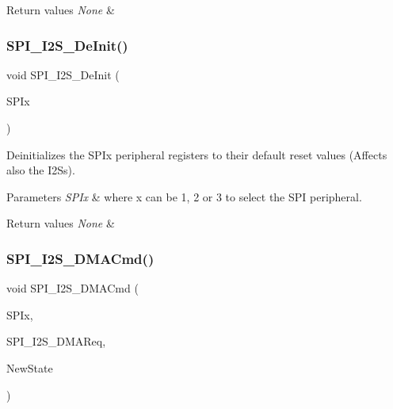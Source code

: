 \begin{DoxyRetVals}{Return values}
{\em None} & \\
\hline
\end{DoxyRetVals}
\mbox{\label{group___s_p_i___exported___functions_gabe36880945fa56785283a9c0092124cc}} 
\subsubsection{\texorpdfstring{SPI\_I2S\_DeInit()}{SPI\_I2S\_DeInit()}}
{\footnotesize\ttfamily void S\+P\+I\+\_\+\+I2\+S\+\_\+\+De\+Init (\begin{DoxyParamCaption}\item[{\mbox{\hyperlink{struct_s_p_i___type_def}{S\+P\+I\+\_\+\+Type\+Def}} $\ast$}]{S\+P\+Ix }\end{DoxyParamCaption})}



Deinitializes the S\+P\+Ix peripheral registers to their default reset values (Affects also the I2\+Ss). 


\begin{DoxyParams}{Parameters}
{\em S\+P\+Ix} & where x can be 1, 2 or 3 to select the S\+PI peripheral. \\
\hline
\end{DoxyParams}

\begin{DoxyRetVals}{Return values}
{\em None} & \\
\hline
\end{DoxyRetVals}
\mbox{\label{group___s_p_i___exported___functions_gabed5b91a8576e6d578f364cc0e807e4a}} 
\subsubsection{\texorpdfstring{SPI\_I2S\_DMACmd()}{SPI\_I2S\_DMACmd()}}
{\footnotesize\ttfamily void S\+P\+I\+\_\+\+I2\+S\+\_\+\+D\+M\+A\+Cmd (\begin{DoxyParamCaption}\item[{\mbox{\hyperlink{struct_s_p_i___type_def}{S\+P\+I\+\_\+\+Type\+Def}} $\ast$}]{S\+P\+Ix,  }\item[{uint16\+\_\+t}]{S\+P\+I\+\_\+\+I2\+S\+\_\+\+D\+M\+A\+Req,  }\item[{\mbox{\hyperlink{group___exported__types_gac9a7e9a35d2513ec15c3b537aaa4fba1}{Functional\+State}}}]{New\+State }\end{DoxyParamCaption})}



